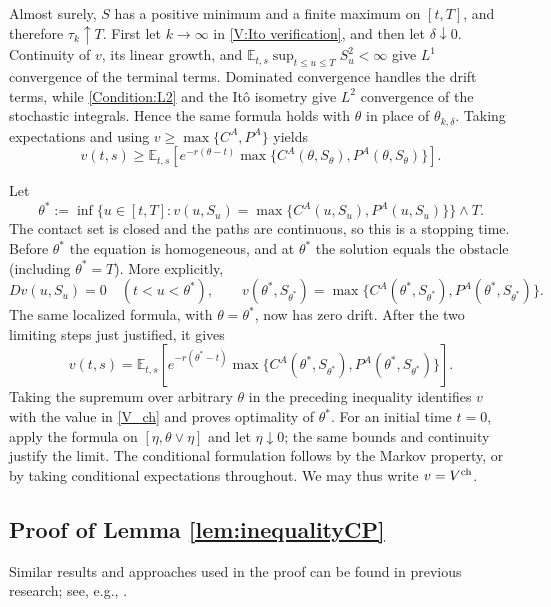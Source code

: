 \documentclass[11pt, a4paper, leqno]{amsart}
\numberwithin{equation}{section}
\theoremstyle{plain}
\theoremstyle{definition}
\theoremstyle{remark}
\def\leq{\leqslant}
\def\geq{\geqslant}
\begin{document}
{Almost surely, $S$ has a positive minimum and a finite maximum on
$[t,T]$, and therefore $\tau_k\uparrow T$. First let $k\to\infty$
in \eqref{V:Ito verification}, and then let $\delta\downarrow0$.
Continuity of $v$, its linear growth, and
$\mathbb E_{t,s}\sup_{t\leq u\leq T}S_u^2<\infty$ give $L^1$
convergence of the terminal terms. Dominated convergence handles
the drift terms, while \eqref{Condition:L2} and the It\^o isometry
give $L^2$ convergence of the stochastic integrals. Hence the same
formula holds with $\theta$ in place of $\theta_{k,\delta}$.
Taking expectations and using $v\geq\max\{C^A,P^A\}$ yields
\[
 v(t,s)\geq
 \mathbb E_{t,s}\!\left[e^{-r(\theta-t)}
     \max\{C^A(\theta,S_\theta),P^A(\theta,S_\theta)\}\right].
\]

Let
\[
 \theta^*:=\inf\{u\in[t,T]:
       v(u,S_u)=\max\{C^A(u,S_u),P^A(u,S_u)\}\}\wedge T.
\]
The contact set is closed and the paths are continuous, so this is
a stopping time. Before $\theta^*$ the equation is homogeneous,
and at $\theta^*$ the solution equals the obstacle (including
$\theta^*=T$). More explicitly,
\begin{equation}\label{V:C reg}
 Dv(u,S_u)=0\quad(t<u<\theta^*),\qquad
 v(\theta^*,S_{\theta^*})
 =\max\{C^A(\theta^*,S_{\theta^*}),P^A(\theta^*,S_{\theta^*})\}.
\end{equation}
The same localized formula, with $\theta=\theta^*$, now has zero
drift. After the two limiting steps just justified, it gives
\[
 v(t,s)=\mathbb E_{t,s}\!\left[e^{-r(\theta^*-t)}
     \max\{C^A(\theta^*,S_{\theta^*}),P^A(\theta^*,S_{\theta^*})\}\right].
\]
Taking the supremum over arbitrary $\theta$ in the preceding
inequality identifies $v$ with the value in \eqref{V_ch} and proves
optimality of $\theta^*$. For an initial time $t=0$, apply the formula
on $[\eta,\theta\vee\eta]$ and let $\eta\downarrow0$;
the same bounds and continuity justify the limit. The conditional
formulation follows by the Markov property, or by taking conditional
expectations throughout. We may thus write $v=V^{\rm ch}$.
}

\label{rev:verification-end}
\subsection{Proof of Lemma \ref{lem:inequalityCP}}\label{Appendix.C}

Similar results and approaches used in the proof can be found in previous
research; see, e.g., \cite{ZF09, ZF09-1}.
\end{document}
